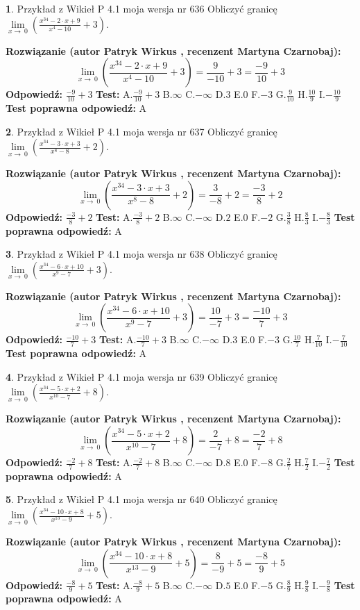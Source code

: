\documentclass[12pt, a4paper]{article}
\theoremstyle{definition} %
\newtheorem{zad}{}
\newcommand{\zadStart}[1]{\begin{zad}#1\newline}
\newcommand{\zadStop}{\end{zad}}
\newcommand{\rozwStart}[2]{\noindent \textbf{Rozwiązanie (autor #1 , recenzent #2): }\newline}
\newcommand{\rozwStop}{\newline}
\newcommand{\odpStart}{\noindent \textbf{Odpowiedź:}\newline}
\newcommand{\odpStop}{\newline}
\newcommand{\testStart}{\noindent \textbf{Test:}\newline}
\newcommand{\testStop}{\newline}
\newcommand{\kluczStart}{\noindent \textbf{Test poprawna odpowiedź:}\newline}
\newcommand{\kluczStop}{\newline}
\begin{document}
\zadStart{Przykład z Wikieł P 4.1 moja wersja nr 636}
Obliczyć granicę $\lim\limits_{x\to\ 0}(\frac{x^{34}-2 \cdot x +9}{x^{4}-10}+3)$.
\zadStop
\rozwStart{Patryk Wirkus}{Martyna Czarnobaj}
$$\lim\limits_{x\to\ 0}(\frac{x^{34}-2 \cdot x +9}{x^{4}-10}+3)=\frac{9}{-10}+3=\frac{-9}{10}+3$$
\rozwStop
\odpStart
$\frac{-9}{10}+3$
\odpStop
\testStart
A.$\frac{-9}{10}+3$
B.$\infty$
C.$-\infty$
D.$3$
E.$0$
F.$-3$
G.$\frac{9}{10}$
H.$\frac{10}{9}$
I.$-\frac{10}{9}$
\testStop
\kluczStart
A
\kluczStop



\zadStart{Przykład z Wikieł P 4.1 moja wersja nr 637}
Obliczyć granicę $\lim\limits_{x\to\ 0}(\frac{x^{34}-3 \cdot x +3}{x^{8}-8}+2)$.
\zadStop
\rozwStart{Patryk Wirkus}{Martyna Czarnobaj}
$$\lim\limits_{x\to\ 0}(\frac{x^{34}-3 \cdot x +3}{x^{8}-8}+2)=\frac{3}{-8}+2=\frac{-3}{8}+2$$
\rozwStop
\odpStart
$\frac{-3}{8}+2$
\odpStop
\testStart
A.$\frac{-3}{8}+2$
B.$\infty$
C.$-\infty$
D.$2$
E.$0$
F.$-2$
G.$\frac{3}{8}$
H.$\frac{8}{3}$
I.$-\frac{8}{3}$
\testStop
\kluczStart
A
\kluczStop



\zadStart{Przykład z Wikieł P 4.1 moja wersja nr 638}
Obliczyć granicę $\lim\limits_{x\to\ 0}(\frac{x^{34}-6 \cdot x +10}{x^{9}-7}+3)$.
\zadStop
\rozwStart{Patryk Wirkus}{Martyna Czarnobaj}
$$\lim\limits_{x\to\ 0}(\frac{x^{34}-6 \cdot x +10}{x^{9}-7}+3)=\frac{10}{-7}+3=\frac{-10}{7}+3$$
\rozwStop
\odpStart
$\frac{-10}{7}+3$
\odpStop
\testStart
A.$\frac{-10}{7}+3$
B.$\infty$
C.$-\infty$
D.$3$
E.$0$
F.$-3$
G.$\frac{10}{7}$
H.$\frac{7}{10}$
I.$-\frac{7}{10}$
\testStop
\kluczStart
A
\kluczStop



\zadStart{Przykład z Wikieł P 4.1 moja wersja nr 639}
Obliczyć granicę $\lim\limits_{x\to\ 0}(\frac{x^{34}-5 \cdot x +2}{x^{10}-7}+8)$.
\zadStop
\rozwStart{Patryk Wirkus}{Martyna Czarnobaj}
$$\lim\limits_{x\to\ 0}(\frac{x^{34}-5 \cdot x +2}{x^{10}-7}+8)=\frac{2}{-7}+8=\frac{-2}{7}+8$$
\rozwStop
\odpStart
$\frac{-2}{7}+8$
\odpStop
\testStart
A.$\frac{-2}{7}+8$
B.$\infty$
C.$-\infty$
D.$8$
E.$0$
F.$-8$
G.$\frac{2}{7}$
H.$\frac{7}{2}$
I.$-\frac{7}{2}$
\testStop
\kluczStart
A
\kluczStop



\zadStart{Przykład z Wikieł P 4.1 moja wersja nr 640}
Obliczyć granicę $\lim\limits_{x\to\ 0}(\frac{x^{34}-10 \cdot x +8}{x^{13}-9}+5)$.
\zadStop
\rozwStart{Patryk Wirkus}{Martyna Czarnobaj}
$$\lim\limits_{x\to\ 0}(\frac{x^{34}-10 \cdot x +8}{x^{13}-9}+5)=\frac{8}{-9}+5=\frac{-8}{9}+5$$
\rozwStop
\odpStart
$\frac{-8}{9}+5$
\odpStop
\testStart
A.$\frac{-8}{9}+5$
B.$\infty$
C.$-\infty$
D.$5$
E.$0$
F.$-5$
G.$\frac{8}{9}$
H.$\frac{9}{8}$
I.$-\frac{9}{8}$
\testStop
\kluczStart
A
\kluczStop
\end{document}
